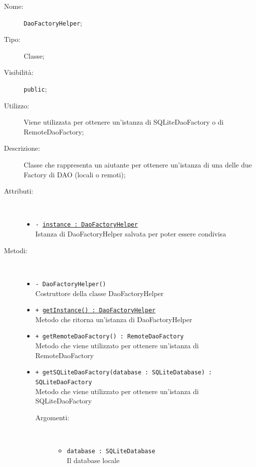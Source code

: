 \documentclass[../DefinizioneDiProdotto.tex]{subfiles}
\begin{document}
\begin{description}
	\item[Nome:] \texttt{DaoFactoryHelper};
	\item[Tipo:] Classe;
	\item[Visibilità:] \texttt{public};
	\item[Utilizzo:] Viene utilizzata per ottenere un'istanza di SQLiteDaoFactory o di RemoteDaoFactory;
	\item[Descrizione:] Classe che rappresenta un aiutante per ottenere un'istanza di una delle due Factory di DAO (locali o remoti);
	\item[Attributi:] \
	\begin{itemize}
		\item \texttt{- \underline{instance : DaoFactoryHelper}}\\
		Istanza di DaoFactoryHelper salvata per poter essere condivisa
		
	\end{itemize}
	\item[Metodi:] \
	\begin{itemize}
		\item \texttt{- DaoFactoryHelper()}\\
		Costruttore della classe DaoFactoryHelper
		\item \texttt{+ \underline{getInstance() : DaoFactoryHelper}}\\
		Metodo che ritorna un'istanza di DaoFactoryHelper
		\item \texttt{+ getRemoteDaoFactory() : RemoteDaoFactory}\\
		Metodo che viene utilizzato per ottenere un'istanza di RemoteDaoFactory
		\item \texttt{+ getSQLiteDaoFactory(database : SQLiteDatabase) : SQLiteDaoFactory}\\
		Metodo che viene utilizzato per ottenere un'istanza di SQLiteDaoFactory
		\begin{description}
			\item[Argomenti:] \
			\begin{itemize}
				\item \texttt{database : SQLiteDatabase}\\
				Il database locale\end{itemize}
		\end{description}
	\end{itemize}
\end{description}
\end{document}

